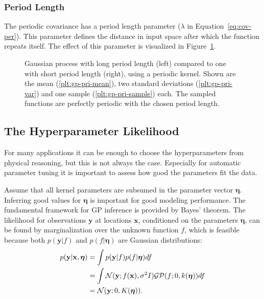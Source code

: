 \subsubsection{Period Length}

The periodic covariance has a period length parameter ($\lambda$ in
Equation~\eqref{eq:cov-per}). This parameter defines the distance in input
space after which the function repeats itself. The effect of this parameter is
visualized in Figure~\ref{fig:different-period-length}.

\begin{figure}
  \setlength{}%
  \setlength\figureheight{0.618\figurewidth}%
  \caption[Gaussian process with long/short period length.]{Gaussian process
with long period length (left) compared to one with short period length
(right), using a periodic kernel. Shown are the mean
(\ref*{plt:gp-pri-mean}), two standard deviations
(\ref*{plt:gp-pri-var}) and one sample (\ref*{plt:gp-pri-sample}) each. The
sampled functions are perfectly periodic with the chosen period length.}
  \label{fig:different-period-length}
\end{figure}

\subsection{The Hyperparameter Likelihood}

For many applications it can be enough to choose the hyperparameters from
physical reasoning, but this is not always the case. Especially for automatic
parameter tuning it is important to assess how good the parameters fit the data.

Assume that all kernel parameters are subsumed in the parameter vector
$\boldsymbol{\eta}$. Inferring good values for $\boldsymbol{\eta}$ is important
for good modeling performance. The fundamental framework for GP inference is
provided by Bayes' theorem. The likelihood for observations $\mathbf{y}$ at
locations $\mathbf{x}$, conditioned on the parameters $\boldsymbol{\eta}$, can
be found by marginalization over the unknown function $f$, which is feasible
because both $p(\mathbf{y}|f)$ and $p(f|\boldsymbol{\eta})$ are Gaussian
distributions:
\begin{align}
  p(\mathbf{y}|\mathbf{x},\boldsymbol{\eta}) &= \int
  p(\mathbf{y}|f)p(f|\boldsymbol{\eta}) df\\
  \notag
  &= \int \mathcal{N}(\mathbf{y};f(\mathbf{x}),\sigma^2 I)\mathcal{GP}(f;0,k(\boldsymbol{\eta}))
  df\\
  \notag &= \mathcal{N}(\mathbf{y};0,K(\boldsymbol{\eta})).
\end{align}

